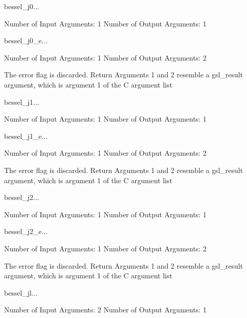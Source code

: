 \begin{funcdesc}{bessel_j0}{...}

    Number of Input  Arguments:  1
    Number of Output Arguments:  1
\end{funcdesc}

\begin{funcdesc}{bessel_j0_e}{...}

    Number of Input  Arguments:  1
    Number of Output Arguments:  2

The error flag is discarded.
Return Arguments 1 and 2 resemble a gsl_result argument,
	which is  argument 1 of the C argument list

\end{funcdesc}

\begin{funcdesc}{bessel_j1}{...}

    Number of Input  Arguments:  1
    Number of Output Arguments:  1
\end{funcdesc}

\begin{funcdesc}{bessel_j1_e}{...}

    Number of Input  Arguments:  1
    Number of Output Arguments:  2

The error flag is discarded.
Return Arguments 1 and 2 resemble a gsl_result argument,
	which is  argument 1 of the C argument list

\end{funcdesc}

\begin{funcdesc}{bessel_j2}{...}

    Number of Input  Arguments:  1
    Number of Output Arguments:  1
\end{funcdesc}

\begin{funcdesc}{bessel_j2_e}{...}

    Number of Input  Arguments:  1
    Number of Output Arguments:  2

The error flag is discarded.
Return Arguments 1 and 2 resemble a gsl_result argument,
	which is  argument 1 of the C argument list

\end{funcdesc}

\begin{funcdesc}{bessel_jl}{...}

    Number of Input  Arguments:  2
    Number of Output Arguments:  1
\end{funcdesc}

